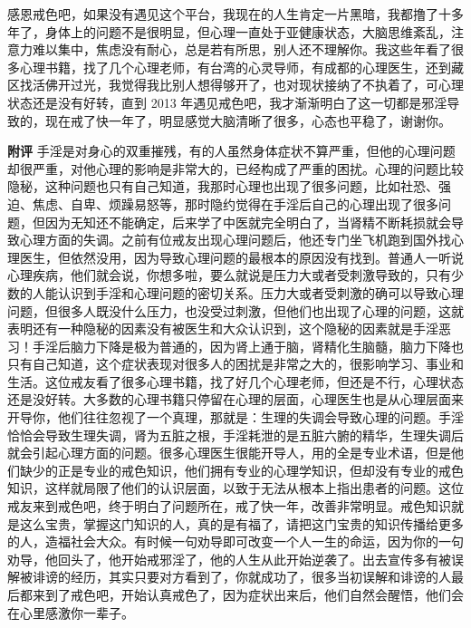\begin{case}
    感恩戒色吧，如果没有遇见这个平台，我现在的人生肯定一片黑暗，我都撸了十多年了，身体上的问题不是很明显，但心理一直处于亚健康状态，大脑思维紊乱，注意力难以集中，焦虑没有耐心，总是若有所思，别人还不理解你。我这些年看了很多心理书籍，找了几个心理老师，有台湾的心灵导师，有成都的心理医生，还到藏区找活佛开过光，我觉得我比别人想得够开了，也对现状接纳了不执着了，可心理状态还是没有好转，直到 2013 年遇见戒色吧，我才渐渐明白了这一切都是邪淫导致的，现在戒了快一年了，明显感觉大脑清晰了很多，心态也平稳了，谢谢你。

    \textbf{附评} 手淫是对身心的双重摧残，有的人虽然身体症状不算严重，但他的心理问题却很严重，对他心理的影响是非常大的，已经构成了严重的困扰。心理的问题比较隐秘，这种问题也只有自己知道，我那时心理也出现了很多问题，比如社恐、强迫、焦虑、自卑、烦躁易怒等，那时隐约觉得在手淫后自己的心理出现了很多问题，但因为无知还不能确定，后来学了中医就完全明白了，当肾精不断耗损就会导致心理方面的失调。之前有位戒友出现心理问题后，他还专门坐飞机跑到国外找心理医生，但依然没用，因为导致心理问题的最根本的原因没有找到。普通人一听说心理疾病，他们就会说，你想多啦，要么就说是压力大或者受刺激导致的，只有少数的人能认识到手淫和心理问题的密切关系。压力大或者受刺激的确可以导致心理问题，但很多人既没什么压力，也没受过刺激，但他们也出现了心理的问题，这就表明还有一种隐秘的因素没有被医生和大众认识到，这个隐秘的因素就是手淫恶习！手淫后脑力下降是极为普通的，因为肾上通于脑，肾精化生脑髓，脑力下降也只有自己知道，这个症状表现对很多人的困扰是非常之大的，很影响学习、事业和生活。这位戒友看了很多心理书籍，找了好几个心理老师，但还是不行，心理状态还是没好转。大多数的心理书籍只停留在心理的层面，心理医生也是从心理层面来开导你，他们往往忽视了一个真理，那就是：生理的失调会导致心理的问题。手淫恰恰会导致生理失调，肾为五脏之根，手淫耗泄的是五脏六腑的精华，生理失调后就会引起心理方面的问题。很多心理医生很能开导人，用的全是专业术语，但是他们缺少的正是专业的戒色知识，他们拥有专业的心理学知识，但却没有专业的戒色知识，这样就局限了他们的认识层面，以致于无法从根本上指出患者的问题。这位戒友来到戒色吧，终于明白了问题所在，戒了快一年，改善非常明显。戒色知识就是这么宝贵，掌握这门知识的人，真的是有福了，请把这门宝贵的知识传播给更多的人，造福社会大众。有时候一句劝导即可改变一个人一生的命运，因为你的一句劝导，他回头了，他开始戒邪淫了，他的人生从此开始逆袭了。出去宣传多有被误解被诽谤的经历，其实只要对方看到了，你就成功了，很多当初误解和诽谤的人最后都来到了戒色吧，开始认真戒色了，因为症状出来后，他们自然会醒悟，他们会在心里感激你一辈子。
\end{case}

